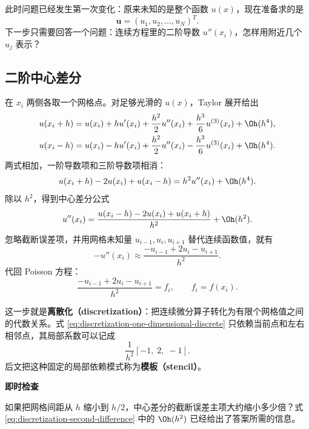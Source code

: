 此时问题已经发生第一次变化：原来未知的是整个函数 $u(x)$，现在准备求的是
\begin{equation}
\bm u=(u_1,u_2,\ldots,u_N)^T.
\end{equation}
下一步只需要回答一个问题：连续方程里的二阶导数 $u''(x_i)$，怎样用附近几个 $u_j$ 表示？

\subsection{二阶中心差分}

在 $x_i$ 两侧各取一个网格点。对足够光滑的 $u(x)$，Taylor 展开给出
\begin{align}
u(x_i+h)
&=u(x_i)+h u'(x_i)+\frac{h^2}{2}u''(x_i)
 +\frac{h^3}{6}u^{(3)}(x_i)+\Oh(h^4),\\
u(x_i-h)
&=u(x_i)-h u'(x_i)+\frac{h^2}{2}u''(x_i)
 -\frac{h^3}{6}u^{(3)}(x_i)+\Oh(h^4).
\end{align}
两式相加，一阶导数项和三阶导数项相消：
\begin{equation}
u(x_i+h)-2u(x_i)+u(x_i-h)
=h^2u''(x_i)+\Oh(h^4).
\end{equation}
除以 $h^2$，得到中心差分公式
\begin{equation}
u''(x_i)
=\frac{u(x_i-h)-2u(x_i)+u(x_i+h)}{h^2}+\Oh(h^2).
\label{eq:discretization-second-difference}
\end{equation}
忽略截断误差项，并用网格未知量 $u_{i-1},u_i,u_{i+1}$ 替代连续函数值，就有
\begin{equation}
-u''(x_i)
\approx
\frac{-u_{i-1}+2u_i-u_{i+1}}{h^2}.
\label{eq:discretization-one-dimensional-stencil-equation}
\end{equation}
代回 Poisson 方程：
\begin{equation}
\frac{-u_{i-1}+2u_i-u_{i+1}}{h^2}=f_i,
\qquad f_i=f(x_i).
\label{eq:discretization-one-dimensional-discrete}
\end{equation}

这一步就是\textbf{离散化（discretization）}：把连续微分算子转化为有限个网格值之间的代数关系。式 \eqref{eq:discretization-one-dimensional-discrete} 只依赖当前点和左右相邻点，其局部系数可以记成
\begin{equation}
\frac{1}{h^2}[-1,\;2,\;-1].
\end{equation}
后文把这种固定的局部依赖模式称为\textbf{模板（stencil）}。

\begin{checkpointbox}
\textbf{即时检查}

如果把网格间距从 $h$ 缩小到 $h/2$，中心差分的截断误差主项大约缩小多少倍？式 \eqref{eq:discretization-second-difference} 中的 $\Oh(h^2)$ 已经给出了答案所需的信息。
\end{checkpointbox}

